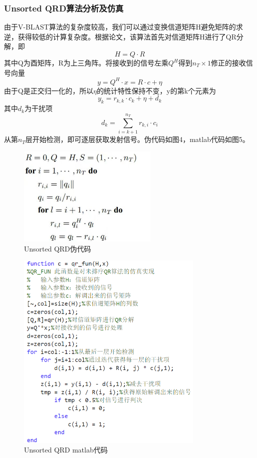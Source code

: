 \documentclass[a4paper,12pt]{article}
\begin{document}
	\subsubsection{Unsorted QRD算法分析及仿真}
	由于V-BLAST算法的复杂度较高，我们可以通过变换信道矩阵H避免矩阵的求逆，获得较低的计算复杂度。根据论文，该算法首先对信道矩阵H进行了QR分解，即$$H=Q\cdot R$$
	其中Q为酉矩阵，R为上三角阵。将接收到的信号左乘$Q^H$得到$n_T\times 1$修正的接收信号向量
	$$y=Q^H\cdot x=R\cdot c+\eta$$
	由于Q是正交归一化的，所以$\eta$的统计特性保持不变，y的第k个元素为
	$$y_k=r_{k,k}\cdot c_k+\eta +d_k$$
	其中$d_k$为干扰项
	$$d_k=\sum_{i=k+1}^{n_T}r_{k,i}\cdot c_i $$
	从第$n_T$层开始检测，即可逐层获取发射信号。伪代码如图4，matlab代码如图5。
	\begin{figure}[h]
		\centering
		\includegraphics[width=0.6\textwidth]{1.jpg}
		\caption{Unsorted QRD伪代码}
	\end{figure}
	\begin{figure}[h]
		\centering
		\includegraphics[width=0.8\textwidth]{4.png}
		\caption{Unsorted QRD matlab代码}
	\end{figure}
	\newpage
\end{document}
